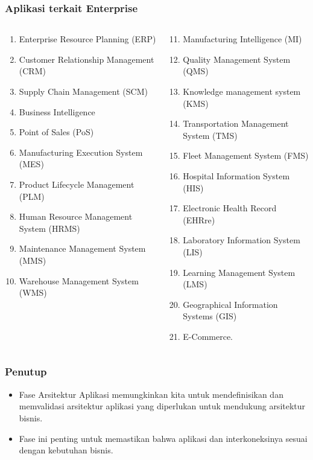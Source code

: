\documentclass[aspectratio=169]{beamer}
\begin{document}
\begin{frame}
	\frametitle{Aplikasi terkait Enterprise}
	\begin{columns}
		\begin{column}{0.5\textwidth}
			\begin{center}
				\begin{enumerate}
					\item Enterprise Resource Planning (ERP)
					\item Customer Relationship Management (CRM)
					\item Supply Chain Management (SCM)
					\item Business Intelligence
					\item Point of Sales (PoS)
					\item Manufacturing Execution System (MES)
					\item Product Lifecycle Management (PLM)
					\item Human Resource Management System (HRMS)
					\item Maintenance Management System (MMS)
					\item Warehouse Management System (WMS)
				\end{enumerate}
			\end{center}
		\end{column}
		\begin{column}{0.5\textwidth}
			\begin{center}
				\begin{enumerate}
					\setcounter{enumi}{10}
					\item Manufacturing Intelligence (MI)
					\item Quality Management System (QMS)
					\item Knowledge management system (KMS)
					\item Transportation Management System (TMS)
					\item Fleet Management System (FMS)
					\item Hospital Information System (HIS)
					\item Electronic Health Record (EHRre)
					\item Laboratory Information System (LIS)
					\item Learning Management System (LMS)
					\item Geographical Information Systems (GIS) 
					\item E-Commerce.
				\end{enumerate}
			\end{center}
		\end{column}
	\end{columns}
\end{frame}


\begin{frame}
\frametitle{Penutup}
\begin{itemize}
	\item Fase Arsitektur Aplikasi memungkinkan kita untuk mendefinisikan dan memvalidasi arsitektur aplikasi yang diperlukan untuk mendukung arsitektur bisnis.
	\item Fase ini penting untuk memastikan bahwa aplikasi dan interkoneksinya sesuai dengan kebutuhan bisnis.
\end{itemize}
\end{frame}
\end{document}
